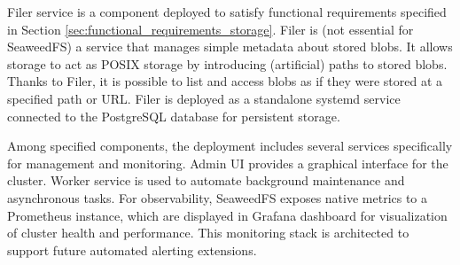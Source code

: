 Filer service is a component deployed to satisfy functional requirements specified in Section \ref{sec:functional_requirements_storage}. Filer is (not essential for SeaweedFS) a service that manages simple metadata about stored blobs. It allows storage to act as POSIX storage by introducing (artificial) paths to stored blobs. Thanks to Filer, it is possible to list and access blobs as if they were stored at a specified path or URL. Filer is deployed as a standalone systemd service connected to the PostgreSQL database for persistent storage.

Among specified components, the deployment includes several services specifically for management and monitoring. Admin UI provides a graphical interface for the cluster. Worker service is used to automate background maintenance and asynchronous tasks. For observability, SeaweedFS exposes native metrics to a Prometheus instance, which are displayed in Grafana dashboard for visualization of cluster health and performance. This monitoring stack is architected to support future automated alerting extensions.
